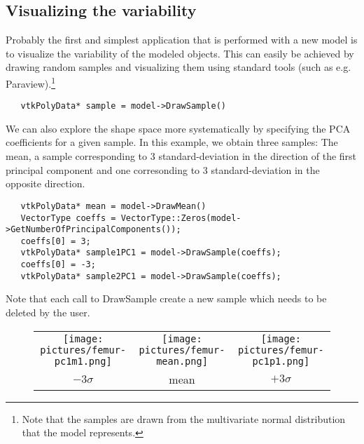 \documentclass{InsightArticle}
\begin{document}
\subsection{Visualizing the variability} \label{sec:visvariability}
Probably the first and simplest application that is performed with a new model is to visualize the variability of the modeled objects. 
This can easily be achieved by drawing random samples and visualizing them using standard tools (such as e.g. Paraview).\footnote{Note that the samples are drawn from the multivariate normal distribution that the model represents.} 
\begin{verbatim}
   vtkPolyData* sample = model->DrawSample()
\end{verbatim}
We can also explore the shape space more systematically by specifying
the PCA coefficients for a given sample. In this example, we obtain three samples:
The mean, a sample corresponding to 3 standard-deviation in the direction of the
first principal component and one corresonding to 3 standard-deviation in the opposite direction.
\begin{verbatim}
   vtkPolyData* mean = model->DrawMean()
   VectorType coeffs = VectorType::Zeros(model->GetNumberOfPrincipalComponents());
   coeffs[0] = 3;
   vtkPolyData* sample1PC1 = model->DrawSample(coeffs);
   coeffs[0] = -3;
   vtkPolyData* sample2PC1 = model->DrawSample(coeffs);
\end{verbatim}
Note that each call to DrawSample create a new sample which needs to be deleted by the user.
\begin{figure}[t]
  \begin{tabular}{ccc}
    \texttt{[image: pictures/femur-pc1m1.png]}&
    \texttt{[image: pictures/femur-mean.png]}& 
    \texttt{[image: pictures/femur-pc1p1.png]}
    \\
    $-3 \sigma$ & mean & $+3 \sigma$
  \end{tabular}
    \label{fig:vispca}
\end{figure}
\end{document}
